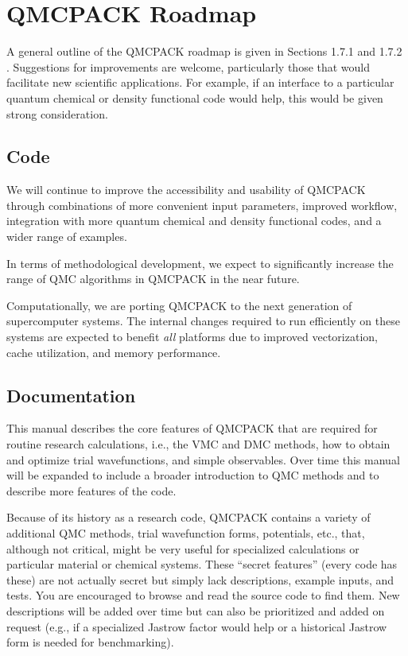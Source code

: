 \section{QMCPACK Roadmap}
\label{sec:roadmap}

A general outline of the QMCPACK roadmap is given in Sections 1.7.1 and 1.7.2 . Suggestions
for improvements are welcome, particularly those that would facilitate new
scientific applications. For example, if an interface to a particular
quantum chemical or density functional code would help, this would be
given strong consideration.

\subsection{Code}

We will continue to improve the accessibility and usability of
QMCPACK through combinations of more convenient input parameters, improved
workflow, integration with more quantum chemical and density
functional codes, and a wider range of examples.

In terms of methodological development, we expect to significantly
increase the range of QMC algorithms in QMCPACK in the near future.

Computationally, we are porting QMCPACK to the next generation of
supercomputer systems. The internal changes required to run efficiently on these
systems are expected to benefit \emph{all} platforms due
to improved vectorization, cache utilization, and memory performance.

\subsection{Documentation}

This manual describes the core features of QMCPACK that are
required for routine research calculations, i.e., the VMC and DMC
methods, how to obtain and optimize trial wavefunctions, and simple
observables. Over time this manual will be expanded to include a
broader introduction to QMC methods and to describe more features of
the code.

Because of its history as a research code, QMCPACK contains a variety of
additional QMC methods, trial wavefunction forms, potentials, etc.,
that, although not critical, might be very useful for specialized
calculations or particular material or chemical systems. These
``secret features'' (every code has these) are not actually secret but
simply lack descriptions, example inputs, and tests. You are
encouraged to browse and read the source code to find them. New
descriptions will be added over time but can also be prioritized and
added on request (e.g., if a specialized Jastrow factor would help or
a historical Jastrow form is needed for benchmarking).


